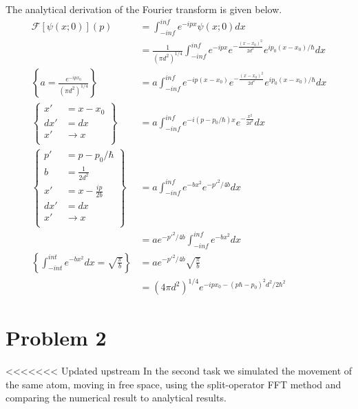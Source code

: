 The analytical derivation of the Fourier transform is given below.
\begin{equation}
\begin{split}
	\mathcal{F}\left[\psi(x;0)\right](p) 							& =  \int_{-inf}^{inf} e^{-ipx} \psi(x;0) dx \\
 																	& = \frac{1}{(\pi d^2)^{1/4}}\int_{-inf}^{inf}e^{-ipx}e^{-\frac{(x-x_0)^2}{2d^2}} e^{ip_0(x-x_0)/\hbar}dx\\
\left\{a=\frac{e^{-ipx_0}}{(\pi d^2)^{1/4}}\right\}					& = a \int_{-inf}^{inf}e^{-ip(x-x_0)}e^{-\frac{(x-x_0)^2}{2d^2}}e^{ip_0(x-x_0)/\hbar} dx\\
\left\{
\begin{array}{ll}
x'	& = x-x_0\\
dx' & = dx   \\
x'	& \rightarrow x\\
\end{array}
\right\} 															& = a\int_{-inf}^{inf}e^{-i(p-p_0/\hbar)x}e^{-\frac{x^2}{2d^2}}dx \\
\left\{
\begin{array}{ll}
p'		& = p-p_0/\hbar\\
b		& = \frac{1}{2d^2}   \\
x'		& = x-\frac{ip}{2b}\\
dx'		& = dx\\
x'		& \rightarrow x\\
\end{array}
\right\}															& = a\int_{-inf}^{inf}e^{-bx^2}e^{-p'^2/4b} dx\\
																	& = ae^{-p'^2/4b}\int_{-inf}^{inf}e^{-bx^2} dx\\
\left\{\int_{-int}^{int}e^{-bx^2}dx=\sqrt{\frac{\pi}{b}}\right\}	& = ae^{-p'^2/4b}\sqrt{\frac{\pi}{b}}\\
																	& = (4\pi d^2)^{1/4}e^{-ipx_0-(p\hbar-p_0)^2d^2/2\hbar^2}
\end{split}
\end{equation}


\section*{Problem 2}

<<<<<<< Updated upstream
In the second task we simulated the movement of the same atom, moving in free space, using the split-operator FFT method and comparing the numerical result to analytical results.



